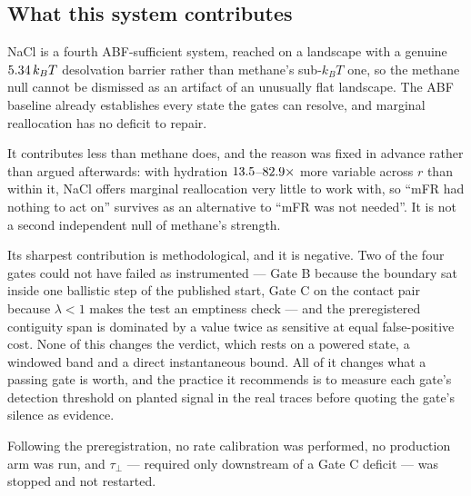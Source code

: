 \subsection{What this system contributes}

NaCl is a fourth ABF-sufficient system, reached on a landscape with a genuine
$5.34\,k_BT$ desolvation barrier rather than methane's sub-$k_BT$ one, so the methane null
cannot be dismissed as an artifact of an unusually flat landscape. The ABF baseline already
establishes every state the gates can resolve, and marginal reallocation has no deficit to
repair.

It contributes less than methane does, and the reason was fixed in advance rather than argued
afterwards: with hydration $13.5$--$82.9\times$ more variable across $r$ than within
it, NaCl offers marginal reallocation very little to work with, so ``mFR had nothing to act on''
survives as an alternative to ``mFR was not needed''. It is not a second independent null of
methane's strength.

Its sharpest contribution is methodological, and it is negative. Two of the four gates could not
have failed as instrumented --- Gate B because the boundary sat inside one ballistic step of the
published start, Gate C on the contact pair because $\lambda < 1$ makes the test an emptiness
check --- and the preregistered contiguity span is dominated by a value twice as sensitive at
equal false-positive cost. None of this changes the verdict, which rests on a powered state, a
windowed band and a direct instantaneous bound. All of it changes what a passing gate is worth,
and the practice it recommends is to measure each gate's detection threshold on planted signal in
the real traces before quoting the gate's silence as evidence.

Following the preregistration, no rate calibration was performed, no production arm was run, and
$\tau_\perp$ --- required only downstream of a Gate C deficit --- was stopped and not restarted.
